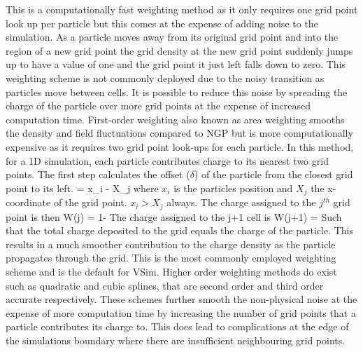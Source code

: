 This is a computationally fast weighting method as it only requires one grid point look up per particle but this comes at the expense of adding noise to the simulation. As a particle moves away from its original grid point and into the region of a new grid point the grid density at the new grid point suddenly jumps up to have a value of one and the grid point it just left falls down to zero. This weighting scheme is not commonly deployed due to the noisy transition as particles move between cells. It is possible to reduce this noise by spreading the charge of the particle over more grid points at the expense of increased computation time. First-order weighting also known as area weighting smooths the density and field fluctuations compared to NGP but is more computationally expensive as it requires two grid point look-ups for each particle. In this method, for a 1D simulation, each particle contributes charge to its nearest two grid points. The first step calculates the offset ($\delta$) of the particle from the closest grid point to its left. 
\be
\delta = x_i - X_j 
\ee 
where $x_i$ is the particles position and $X_j$ the x-coordinate of the grid point. $x_i > X_j$ always. The charge assigned to the $j^{th}$ grid point is then 
\be 
W(j) = 1-\delta
\ee 
The charge assigned to the j+1 cell is 
\be 
W(j+1) = \delta
\ee
Such that the total charge deposited to the grid equals the charge of the particle. This results in a much smoother contribution to the charge density as the particle propagates through the grid. This is the most commonly employed weighting scheme and is the default for VSim. Higher order weighting methods do exist such as quadratic and cubic splines, that are second order and third order accurate respectively. These schemes further smooth the non-physical noise at the expense of more computation time by increasing the number of grid points that a particle contributes its charge to. This does lead to complications at the edge of the simulations boundary where there are insufficient neighbouring grid points. 




